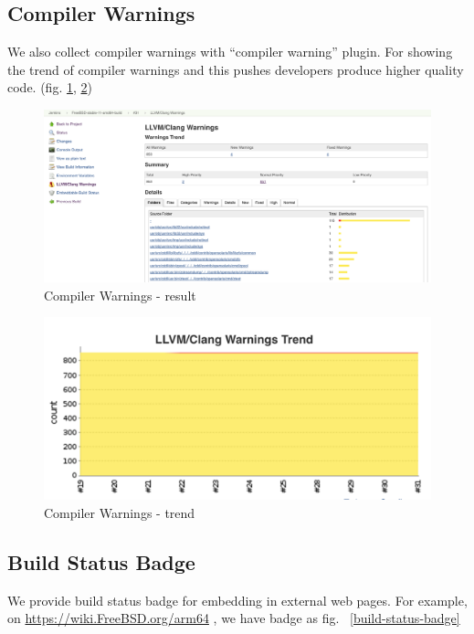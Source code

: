 \documentclass[a4paper,twocolumn,10pt]{article}
\begin{document}
\subsection{Compiler Warnings}

We also collect compiler warnings with ``compiler warning'' plugin. For showing
the trend of compiler warnings and this pushes developers produce higher
quality code. (fig. \ref{compiler-result}, \ref{compiler-trend})

\begin{figure}
\includegraphics[width=\textwidth]{compiler-result.png}
\caption{Compiler Warnings - result}
\label{compiler-result}
\end{figure}

\begin{figure}
\includegraphics{compiler-trend.png}
\caption{Compiler Warnings - trend}
\label{compiler-trend}
\end{figure}

\subsection{Build Status Badge}

We provide build status badge for embedding in external web pages. For example,
on \url{https://wiki.FreeBSD.org/arm64} , we have badge as fig.
~\ref{build-status-badge}
\end{document}
